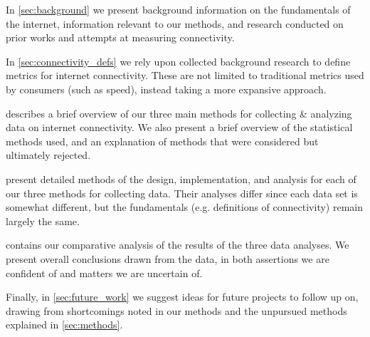 In \cref{sec:background} we present background information on the fundamentals of the internet, information relevant to our methods, and research conducted on prior works and attempts at measuring connectivity.

In \cref{sec:connectivity_defs} we rely upon collected background research to define metrics for internet connectivity. These are not limited to traditional metrics used by consumers (such as speed), instead taking a more expansive approach.

 describes a brief overview of our three main methods for collecting \& analyzing data on internet connectivity. We also present a brief overview of the statistical methods used, and an explanation of methods that were considered but ultimately rejected.

 present detailed methods of the design, implementation, and analysis for each of our three methods for collecting data. Their analyses differ since each data set is somewhat different, but the fundamentals (e.g. definitions of connectivity) remain largely the same.

 contains our comparative analysis of the results of the three data analyses. We present overall conclusions drawn from the data, in both assertions we are confident of and matters we are uncertain of.

Finally, in \cref{sec:future_work} we suggest ideas for future projects to follow up on, drawing from shortcomings noted in our methods and the unpursued methods explained in \cref{sec:methods}.
